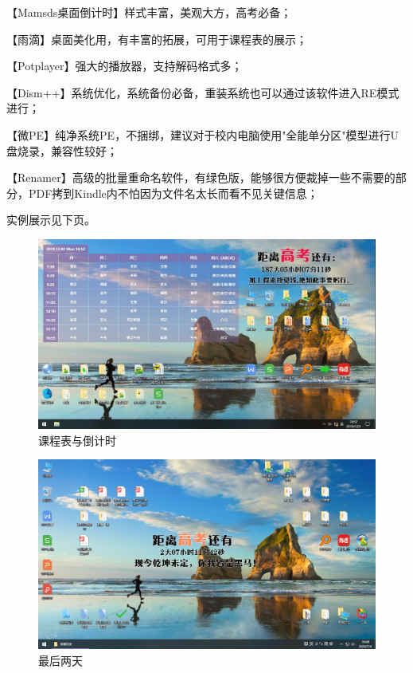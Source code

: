 \documentclass[a5paper]{article}
\begin{document}
        【Mamsds桌面倒计时】样式丰富，美观大方，高考必备；

        【雨滴】桌面美化用，有丰富的拓展，可用于课程表的展示；

        【Potplayer】强大的播放器，支持解码格式多；

        【Dism++】系统优化，系统备份必备，重装系统也可以通过该软件进入RE模式进行；

        【微PE】纯净系统PE，不捆绑，建议对于校内电脑使用"全能单分区"模型进行U盘烧录，兼容性较好；

        【Renamer】高级的批量重命名软件，有绿色版，能够很方便裁掉一些不需要的部分，PDF拷到Kindle内不怕因为文件名太长而看不见关键信息；

        实例展示见下页。

        \begin{figure}[htbp]
        \centering
        \includegraphics[scale=0.25]{2.3-p4.png}
        \caption{课程表与倒计时}
        \end{figure}

        \begin{figure}[htbp]
        \centering
        \includegraphics[scale=0.25]{2.3-p5.png}
        \caption{最后两天}
        \end{figure}
\end{document}
